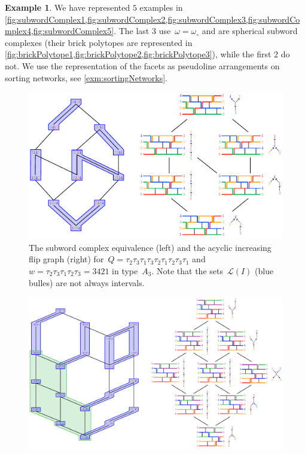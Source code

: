 \documentclass[reqno]{amsart}
\theoremstyle{definition}
\newtheorem{example}[theorem]{Example}
\newcommand{\linearExtensions}{\mathcal{L}} %
\newcommand{\wo}{\omega_\circ} %
\begin{document}
\begin{example}
We have represented $5$ examples in \cref{fig:subwordComplex1,fig:subwordComplex2,fig:subwordComplex3,fig:subwordComplex4,fig:subwordComplex5}.
The last $3$ use~$\omega = \wo$ and are spherical subword complexes (their brick polytopes are represented in \cref{fig:brickPolytope1,fig:brickPolytope2,fig:brickPolytope3}), while the first $2$ do not.
We use the representation of the facets as pseudoline arrangements on sorting networks, see \cref{exm:sortingNetworks}.
%
\begin{figure}[p]
	\centerline{\includegraphics[scale=.7]{subwordComplex4}}
	\caption{The subword complex equivalence (left) and the acyclic increasing flip graph (right) for~$Q = \tau_2 \tau_3 \tau_1 \tau_3 \tau_2 \tau_1 \tau_2 \tau_3 \tau_1$ and~$w = \tau_2 \tau_3 \tau_1 \tau_2 \tau_3 = 3421$ in type~$A_3$. Note that the sets~$\linearExtensions(I)$ (blue bulles) are not always intervals.}
	\label{fig:subwordComplex4}
\end{figure}
%
\begin{figure}[p]
	\centerline{\includegraphics[scale=.7]{subwordComplex5}}

\end{figure}
\end{example}
\end{document}
